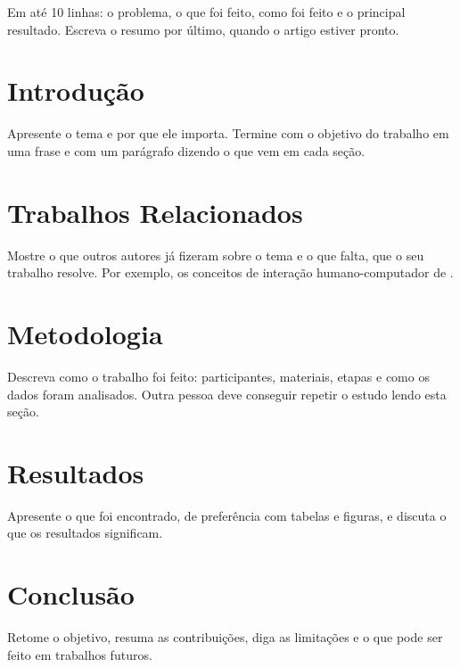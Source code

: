 \documentclass[12pt]{article}
\title{$titulo}
\author{$autor\inst{1}}
\begin{document}
\maketitle

\begin{abstract}
Write here the same summary as below, in English. Most SBC events ask for both versions.
\end{abstract}

\begin{resumo}
Em até 10 linhas: o problema, o que foi feito, como foi feito e o principal resultado. Escreva o resumo por último, quando o artigo estiver pronto.
\end{resumo}

\section{Introdução}

Apresente o tema e por que ele importa. Termine com o objetivo do trabalho em uma frase e com um parágrafo dizendo o que vem em cada seção.

\section{Trabalhos Relacionados}

Mostre o que outros autores já fizeram sobre o tema e o que falta, que o seu trabalho resolve. Por exemplo, os conceitos de interação humano-computador de \cite{barbosa2010ihc}.

\section{Metodologia}

Descreva como o trabalho foi feito: participantes, materiais, etapas e como os dados foram analisados. Outra pessoa deve conseguir repetir o estudo lendo esta seção.

\section{Resultados}

Apresente o que foi encontrado, de preferência com tabelas e figuras, e discuta o que os resultados significam.

\section{Conclusão}

Retome o objetivo, resuma as contribuições, diga as limitações e o que pode ser feito em trabalhos futuros.



\end{document}
